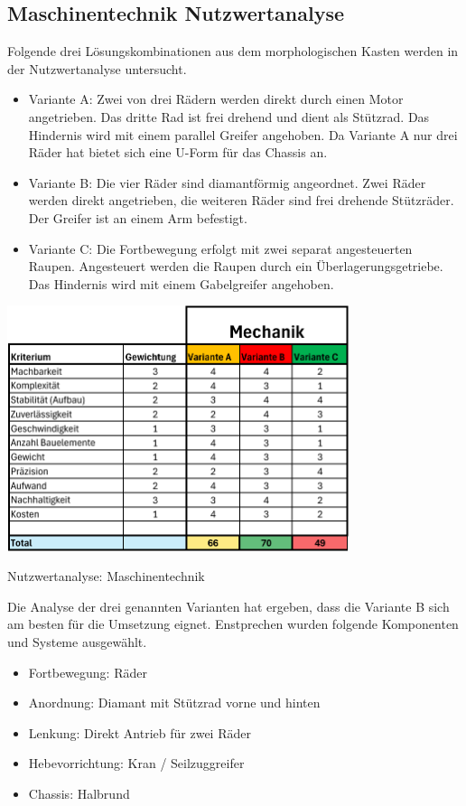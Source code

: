 \subsection{Maschinentechnik Nutzwertanalyse}

Folgende drei Lösungskombinationen aus dem morphologischen Kasten werden in der Nutzwertanalyse untersucht. 

\begin{itemize}
    \item Variante A: Zwei von drei Rädern werden direkt durch einen Motor angetrieben. Das dritte Rad ist frei drehend und dient als Stützrad. Das Hindernis wird mit einem parallel Greifer angehoben. Da Variante A nur drei Räder hat bietet sich eine U-Form für das Chassis an. 
    \item Variante B: Die vier Räder sind diamantförmig angeordnet. Zwei Räder werden direkt angetrieben, die weiteren Räder sind frei drehende Stützräder. Der Greifer ist an einem Arm befestigt. 
    \item Variante C: Die Fortbewegung erfolgt mit zwei separat angesteuerten Raupen. Angesteuert werden die Raupen durch ein Überlagerungsgetriebe. Das Hindernis wird mit einem Gabelgreifer angehoben. 
\end{itemize}

\begin{table}[H]
\centering
\includegraphics[width=0.75\textwidth]{assets/Nutzwertanalyse-M.pdf}
\caption{Nutzwertanalyse: Maschinentechnik}
\label{table:nutzwert-maschinentechnik}
\end{table}

Die Analyse der drei genannten Varianten hat ergeben, dass die Variante B sich am besten für die Umsetzung eignet. Enstprechen wurden folgende Komponenten und Systeme ausgewählt. 

\begin{itemize}
    \item Fortbewegung: Räder 
    \item Anordnung: Diamant mit Stützrad vorne und hinten
    \item Lenkung: Direkt Antrieb für zwei Räder
    \item Hebevorrichtung: Kran / Seilzuggreifer
    \item Chassis: Halbrund 
\end{itemize}

